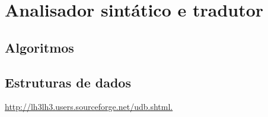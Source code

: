 \section{Analisador sintático e tradutor}
\label{sec:sintatico:desenho}


\subsection{Algoritmos}
\label{sec:subsection:algoritmos:desenho}


\subsection{Estruturas de dados}
\label{sec:subsec:estruturas:desenho}

\url{http://lh3lh3.users.sourceforge.net/udb.shtml.}
